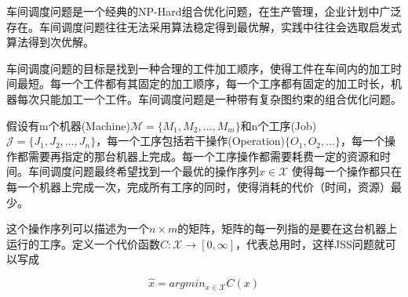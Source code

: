 车间调度问题是一个经典的NP-Hard组合优化问题，在生产管理，企业计划中广泛存在。车间调度问题往往无法采用算法稳定得到最优解，实践中往往会选取启发式算法得到次优解。

车间调度问题的目标是找到一种合理的工件加工顺序，使得工件在车间内的加工时间最短。每一个工件都有其固定的加工顺序，每一个工序都有固定的加工时长，机器每次只能加工一个工件。车间调度问题是一种带有复杂图约束的组合优化问题。


假设有m个机器(Machine)$\mathcal{M}=\{M_1,M_2,\dots,M_m\}$和n个工序(Job)$\mathcal{J}=\{J_1,J_2,\dots,J_n\}$，每一个工序包括若干操作(Operation)$\{O_1,O_2,\dots\}$，每一个操作都需要再指定的那台机器上完成。每一个工序操作都需要耗费一定的资源和时间。车间调度问题最终希望找到一个最优的操作序列$x\in \mathcal{X}$ 使得每一个操作都只在每一个机器上完成一次，完成所有工序的同时，使得消耗的代价（时间，资源）最少。

这个操作序列可以描述为一个$n\times m$的矩阵，矩阵的每一列指的是要在这台机器上运行的工序。定义一个代价函数$C:\mathcal{X}\rightarrow [0,\infty]$，代表总用时，这样JSS问题就可以写成

$$\hat{x}=argmin_{x\in \mathcal{X}}C(x)$$

